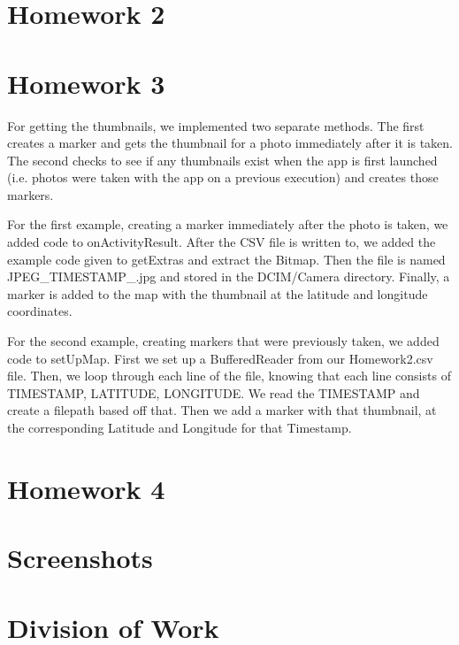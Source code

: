 \documentclass[]{article}
\begin{document}
\section{Homework 2}
\section{Homework 3}
For getting the thumbnails, we implemented two separate methods. The first creates a marker and gets the thumbnail for a photo immediately after it is taken. The second checks to see if any thumbnails exist when the app is first launched (i.e. photos were taken with the app on a previous execution) and creates those markers.

For the first example, creating a marker immediately after the photo is taken, we added code to onActivityResult. After the CSV file is written to, we added the example code given to getExtras and extract the Bitmap. Then the file is named JPEG\_TIMESTAMP\_.jpg and stored in the DCIM/Camera directory. Finally, a marker is added to the map with the thumbnail at the latitude and longitude coordinates.

For the second example, creating markers that were previously taken, we added code to setUpMap. First we set up a BufferedReader from our Homework2.csv file. Then, we loop through each line of the file, knowing that each line consists of TIMESTAMP, LATITUDE, LONGITUDE. We read the TIMESTAMP and create a filepath based off that. Then we add a marker with that thumbnail, at the corresponding Latitude and Longitude for that Timestamp. 
\section{Homework 4}
\section{Screenshots}
\section{Division of Work}
\end{document}
